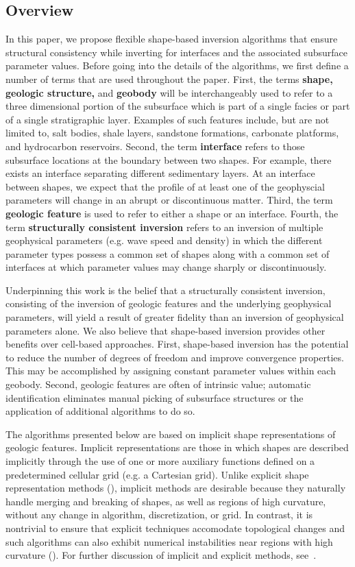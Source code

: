 \documentclass[manuscript,revised]{geophysics}
\begin{document}
\subsection{Overview}
In this paper, we propose flexible shape-based inversion algorithms that ensure structural consistency while inverting for interfaces and the associated subsurface parameter values.  Before going into the details of the algorithms, we first define a number of terms that are used throughout the paper.  First, the terms \textbf{shape, geologic structure,} and \textbf{geobody} will be interchangeably used to refer to a three dimensional portion of the subsurface which is part of a single facies or part of a single stratigraphic layer.  Examples of such features include, but are not limited to, salt bodies, shale layers, sandstone formations, carbonate platforms, and hydrocarbon reservoirs.  Second, the term \textbf{interface} refers to those subsurface locations at the boundary between two shapes.  For example, there exists an interface separating different sedimentary layers.  At an interface between shapes, we expect that the profile of at least one of the geophyscial parameters will change in an abrupt or discontinuous matter.  Third, the term \textbf{geologic feature} is used to refer to either a shape or an interface.  Fourth, the term \textbf{structurally consistent inversion} refers to an inversion of multiple geophysical parameters (e.g. wave speed and density) in which the different parameter types possess a common set of shapes along with a common set of interfaces at which parameter values may change sharply or discontinuously. 

Underpinning this work is the belief that a structurally consistent inversion, consisting of the inversion of geologic features and the underlying geophysical parameters, will yield a result of greater fidelity than an inversion of geophysical parameters alone.  We also believe that shape-based inversion provides other benefits over cell-based approaches.  First, shape-based inversion has the potential to reduce the number of degrees of freedom and improve convergence properties.  This may be accomplished by assigning constant parameter values within each geobody.   Second, geologic features are often of intrinsic value; automatic identification eliminates manual picking of subsurface structures or the application of additional algorithms to do so.

The algorithms presented below are based on implicit shape representations of geologic features.  Implicit representations are those in which shapes are described implicitly through the use of one or more auxiliary functions defined on a predetermined cellular grid (e.g. a Cartesian grid). Unlike explicit shape representation methods (\cite{Galley20}), implicit methods are desirable because they naturally handle merging and breaking of shapes, as well as regions of high curvature, without any change in algorithm, discretization, or grid.   In contrast, it is nontrivial to ensure that explicit techniques accomodate topological changes and such algorithms can also exhibit numerical instabilities near regions with high curvature (\cite{Abubakar_2009}).  For further discussion of implicit and explicit methods, see~\cite{Osher_1988}.
\end{document}
